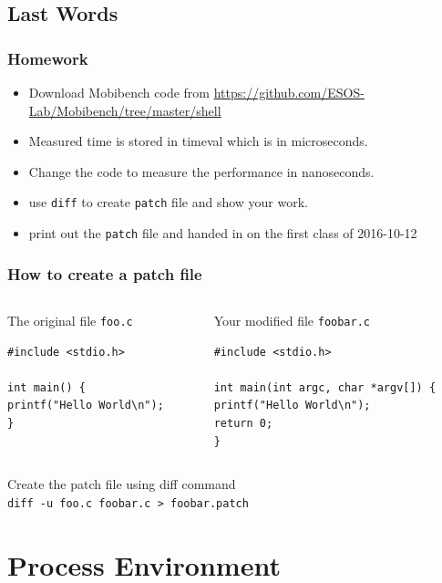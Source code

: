 \documentclass[newPxFont,sthlmFooter,nooffset]{beamer}
\begin{document}
\subsection{Last Words}
\begin{frame}[t]
  \frametitle{Homework}

  \begin{itemize}
  \item Download Mobibench code from \href{https://github.com/ESOS-Lab/Mobibench/tree/master/shell}{https://github.com/ESOS-Lab/Mobibench/tree/master/shell}
  \item Measured time is stored in timeval which is in microseconds.
  \item Change the code to measure the performance in nanoseconds.
  \item use \texttt{diff} to create \texttt{patch} file and show your work.
  \item print out the \texttt{patch} file and handed in on the first class of 2016-10-12
  \end{itemize}
\end{frame}


\begin{frame}[containsverbatim,t]
  \frametitle{How to create a patch file}
\begin{columns}[t]
\begin{column}{0.45\textwidth}
The original file \texttt{foo.c}
\begin{lstlisting}
#include <stdio.h>

int main() {
printf("Hello World\n");
}
\end{lstlisting}
\end{column}
\begin{column}{0.45\textwidth}
Your modified file \texttt{foobar.c}
\begin{lstlisting}
#include <stdio.h>

int main(int argc, char *argv[]) {
printf("Hello World\n");
return 0;
}
\end{lstlisting}
\end{column}
\end{columns}

Create the patch file using diff command \\ \texttt{diff -u foo.c foobar.c > foobar.patch }

{\footnotesize

}
\end{frame}


\section{Process Environment}
\end{document}
